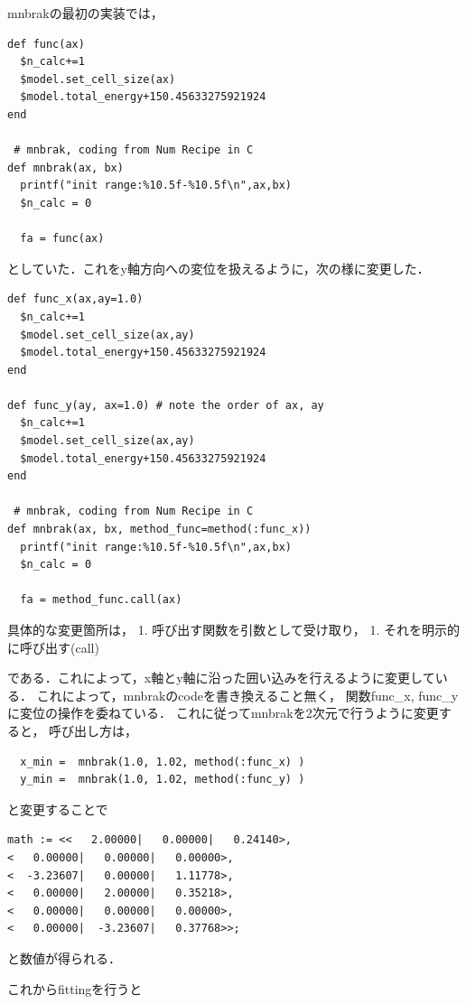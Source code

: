 \documentclass[11pt,dvipdfmx]{jsarticle}
\begin{document}
mnbrakの最初の実装では，

\begin{verbatim}
def func(ax)
  $n_calc+=1
  $model.set_cell_size(ax)
  $model.total_energy+150.45633275921924
end

 # mnbrak, coding from Num Recipe in C
def mnbrak(ax, bx)
  printf("init range:%10.5f-%10.5f\n",ax,bx)
  $n_calc = 0

  fa = func(ax)
\end{verbatim}

としていた．これをy軸方向への変位を扱えるように，次の様に変更した．

\begin{verbatim}
def func_x(ax,ay=1.0)
  $n_calc+=1
  $model.set_cell_size(ax,ay)
  $model.total_energy+150.45633275921924
end

def func_y(ay, ax=1.0) # note the order of ax, ay 
  $n_calc+=1
  $model.set_cell_size(ax,ay)
  $model.total_energy+150.45633275921924
end

 # mnbrak, coding from Num Recipe in C
def mnbrak(ax, bx, method_func=method(:func_x))
  printf("init range:%10.5f-%10.5f\n",ax,bx)
  $n_calc = 0

  fa = method_func.call(ax)
\end{verbatim}

具体的な変更箇所は， 1. 呼び出す関数を引数として受け取り， 1.
それを明示的に呼び出す(call)

である．これによって，x軸とy軸に沿った囲い込みを行えるように変更している．
これによって，mnbrakのcodeを書き換えること無く， 関数func\_x,
func\_yに変位の操作を委ねている．
これに従ってmnbrakを2次元で行うように変更すると， 呼び出し方は，

\begin{verbatim}
  x_min =  mnbrak(1.0, 1.02, method(:func_x) )
  y_min =  mnbrak(1.0, 1.02, method(:func_y) )
\end{verbatim}

と変更することで

\begin{verbatim}
math := <<   2.00000|   0.00000|   0.24140>,
<   0.00000|   0.00000|   0.00000>,
<  -3.23607|   0.00000|   1.11778>,
<   0.00000|   2.00000|   0.35218>,
<   0.00000|   0.00000|   0.00000>,
<   0.00000|  -3.23607|   0.37768>>;
\end{verbatim}

と数値が得られる．

これからfittingを行うと
\end{document}
